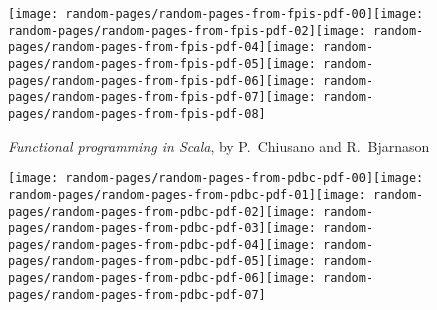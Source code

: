 \begin{figure}
\begin{centering}
\texttt{[image: random-pages/random-pages-from-fpis-pdf-00]}\texttt{[image: random-pages/random-pages-from-fpis-pdf-02]}\texttt{[image: random-pages/random-pages-from-fpis-pdf-04]}\texttt{[image: random-pages/random-pages-from-fpis-pdf-05]}\texttt{[image: random-pages/random-pages-from-fpis-pdf-06]}\texttt{[image: random-pages/random-pages-from-fpis-pdf-07]}\texttt{[image: random-pages/random-pages-from-fpis-pdf-08]}
\par\end{centering}
\vspace{-0\baselineskip}

\begin{centering}
\emph{Functional programming in Scala}, by P.~Chiusano and R.~Bjarnason
\par\end{centering}
\begin{centering}
\vspace{1\baselineskip}
\par\end{centering}
\begin{centering}
\texttt{[image: random-pages/random-pages-from-pdbc-pdf-00]}\texttt{[image: random-pages/random-pages-from-pdbc-pdf-01]}\texttt{[image: random-pages/random-pages-from-pdbc-pdf-02]}\texttt{[image: random-pages/random-pages-from-pdbc-pdf-03]}\texttt{[image: random-pages/random-pages-from-pdbc-pdf-04]}\texttt{[image: random-pages/random-pages-from-pdbc-pdf-05]}\texttt{[image: random-pages/random-pages-from-pdbc-pdf-06]}\texttt{[image: random-pages/random-pages-from-pdbc-pdf-07]}
\par\end{centering}
\vspace{-0.7\baselineskip}


\end{figure}
